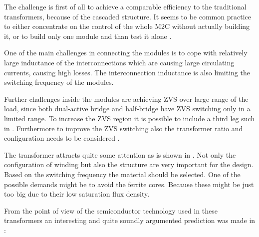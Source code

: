 \documentclass[]{scrartcl}
\begin{document}
The challenge is first of all to achieve a comparable efficiency to the traditional transformers, because of the cascaded structure. It seems to be common practice to either concentrate on the control of the whole M2C without actually building it, or to build only one module and than test it alone \cite{Fan2011}. 

One of the main challenges in connecting the modules is to cope with relatively large inductance of the interconnections which are causing large circulating currents, causing high losses. The interconnection inductance is also limiting the switching frequency of the modules.  

Further challenges inside the modules are achieving ZVS over large range of the load, since both dual-active bridge and half-bridge have ZVS switching only in  a limited range. To increase the ZVS region it is possible to include a third leg such in \cite{Baars2015}. Furthermore to improve the ZVS switching also the transformer ratio and configuration needs to be considered \cite{Baars2015b}.

The transformer attracts quite some attention as is shown in \cite{Huang2013}. Not only the configuration of winding but also the structure are very important for the design. Based on the switching frequency the material should be selected. One of the possible demands might be to avoid the ferrite cores. Because these might be just too big due to their low saturation flux density. 

From the point of view of the semiconductor technology used in these transformers an interesting and quite soundly argumented prediction was made in \cite{Huang2013}:
\end{document}
